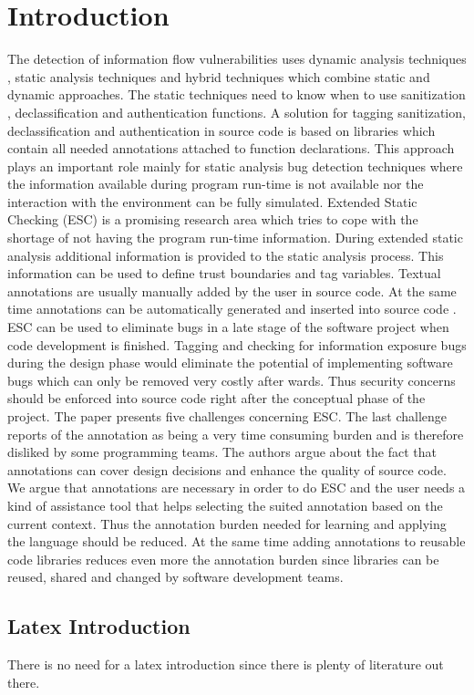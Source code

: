 \chapter{Introduction}
\label{chapter:Introduction}

The detection of information flow vulnerabilities uses dynamic analysis techniques , static analysis techniques and hybrid techniques which combine static and dynamic approaches. The static techniques need to know when to use  sanitization , declassification and authentication functions.
A solution for tagging sanitization, declassification and authentication in source code is based on libraries which contain all needed annotations attached to function declarations. This approach plays an important role mainly for static analysis bug detection techniques where the information available during program run-time is not available nor the interaction with the environment can be fully simulated.
Extended Static Checking (ESC) is a promising research area which tries to cope with the shortage of not having the program run-time information. During extended static analysis additional information is provided to the static analysis process. This information can be used to define trust boundaries and tag variables. Textual annotations are usually manually added by the user in source code. At the same time annotations can be automatically generated and inserted into source code . ESC can be used to eliminate bugs in a late stage of the software project when code development is finished. Tagging and checking for information exposure bugs during the design phase would eliminate the potential of implementing software bugs which can only be removed very costly after wards. Thus security concerns should be enforced into source code right after the conceptual phase of the project.
The paper presents five challenges concerning ESC. The last challenge reports of the annotation as being a very time consuming burden and is therefore disliked by some programming
teams. The authors argue about the fact that annotations can cover design decisions and enhance the quality of source code. We argue that annotations are necessary in order to do ESC and the user needs a kind of assistance tool that helps selecting the suited annotation based on the current context. Thus the annotation burden needed for learning and applying the language should be reduced. At the same time adding annotations to reusable code libraries reduces even more the annotation burden since libraries can be reused, shared and changed by software development
teams.
 
 \cite{haykin2004comprehensive}
\section{Latex Introduction}
There is no need for a latex introduction since there is plenty of literature out there.
 


